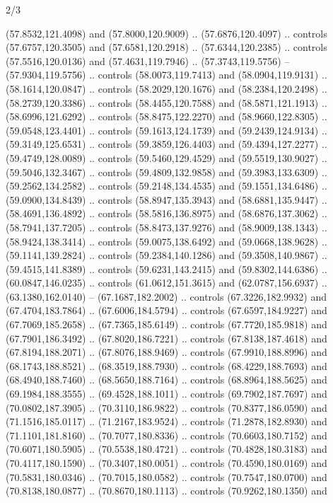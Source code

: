 \begin{flagdescription}{2/3}
\begin{scope}[shift={(0.5\flaglength,0.5)},scale=\flagwidth/320]
\begin{scope}[y=0.8pt, x=0.8pt, yscale=-1,shift={(-118.3,-146)}]
  (57.8532,121.4098) and (57.8000,120.9009) .. (57.6876,120.4097) .. controls
  (57.6757,120.3505) and (57.6581,120.2918) .. (57.6344,120.2385) .. controls
  (57.5516,120.0136) and (57.4631,119.7946) .. (57.3743,119.5756) --
  (57.9304,119.5756) .. controls (58.0073,119.7413) and (58.0904,119.9131) ..
  (58.1614,120.0847) .. controls (58.2029,120.1676) and (58.2384,120.2498) ..
  (58.2739,120.3386) .. controls (58.4455,120.7588) and (58.5871,121.1913) ..
  (58.6996,121.6292) .. controls (58.8475,122.2270) and (58.9660,122.8305) ..
  (59.0548,123.4401) .. controls (59.1613,124.1739) and (59.2439,124.9134) ..
  (59.3149,125.6531) .. controls (59.3859,126.4403) and (59.4394,127.2277) ..
  (59.4749,128.0089) .. controls (59.5460,129.4529) and (59.5519,130.9027) ..
  (59.5046,132.3467) .. controls (59.4809,132.9858) and (59.3983,133.6309) ..
  (59.2562,134.2582) .. controls (59.2148,134.4535) and (59.1551,134.6486) ..
  (59.0900,134.8439) .. controls (58.8947,135.3943) and (58.6881,135.9447) ..
  (58.4691,136.4892) .. controls (58.5816,136.8975) and (58.6876,137.3062) ..
  (58.7941,137.7205) .. controls (58.8473,137.9276) and (58.9009,138.1343) ..
  (58.9424,138.3414) .. controls (59.0075,138.6492) and (59.0668,138.9628) ..
  (59.1141,139.2824) .. controls (59.2384,140.1286) and (59.3508,140.9867) ..
  (59.4515,141.8389) .. controls (59.6231,143.2415) and (59.8302,144.6386) ..
  (60.0847,146.0235) .. controls (61.0612,151.3615) and (62.0787,156.6937) ..
  (63.1380,162.0140) -- (67.1687,182.2002) .. controls (67.3226,182.9932) and
  (67.4704,183.7864) .. (67.6006,184.5794) .. controls (67.6597,184.9227) and
  (67.7069,185.2658) .. (67.7365,185.6149) .. controls (67.7720,185.9818) and
  (67.7901,186.3492) .. (67.8020,186.7221) .. controls (67.8138,187.4618) and
  (67.8194,188.2071) .. (67.8076,188.9469) .. controls (67.9910,188.8996) and
  (68.1743,188.8521) .. (68.3519,188.7930) .. controls (68.4229,188.7693) and
  (68.4940,188.7460) .. (68.5650,188.7164) .. controls (68.8964,188.5625) and
  (69.1984,188.3555) .. (69.4528,188.1011) .. controls (69.7902,187.7697) and
  (70.0802,187.3905) .. (70.3110,186.9822) .. controls (70.8377,186.0590) and
  (71.1516,185.0117) .. (71.2167,183.9524) .. controls (71.2878,182.8930) and
  (71.1101,181.8160) .. (70.7077,180.8336) .. controls (70.6603,180.7152) and
  (70.6071,180.5905) .. (70.5538,180.4721) .. controls (70.4828,180.3183) and
  (70.4117,180.1590) .. (70.3407,180.0051) .. controls (70.4590,180.0169) and
  (70.5831,180.0346) .. (70.7015,180.0582) .. controls (70.7547,180.0700) and
  (70.8138,180.0877) .. (70.8670,180.1113) .. controls (70.9262,180.1350) and

\end{scope}
\end{scope}
\end{flagdescription}
